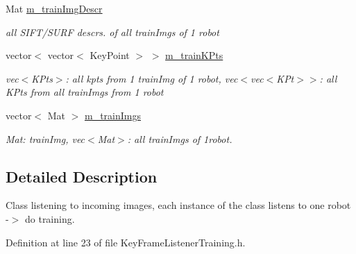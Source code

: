\begin{DoxyCompactItemize}
\-Mat \hyperlink{classKeyFrameListenerTraining_a2db812cb925b74093ef76bc16306d9d7}{m\-\_\-train\-Img\-Descr}
\begin{DoxyCompactList}\small\item\em all \-S\-I\-F\-T/\-S\-U\-R\-F descrs. of all train\-Imgs of 1 robot \end{DoxyCompactList}\item 
vector$<$ vector$<$ \-Key\-Point $>$ $>$ \hyperlink{classKeyFrameListenerTraining_a315dd8f41de6cf586c90f600650a908d}{m\-\_\-train\-K\-Pts}
\begin{DoxyCompactList}\small\item\em vec$<$\-K\-Pts$>$\-: all kpts from 1 train\-Img of 1 robot, vec$<$vec$<$\-K\-Pt$>$$>$\-: all \-K\-Pts from all train\-Imgs from 1 robot \end{DoxyCompactList}\item 
vector$<$ \-Mat $>$ \hyperlink{classKeyFrameListenerTraining_a48bd94c8aaabd896a16fd7bb1557e0e7}{m\-\_\-train\-Imgs}
\begin{DoxyCompactList}\small\item\em \-Mat\-: train\-Img, vec$<$\-Mat$>$\-: all train\-Imgs of 1robot. \end{DoxyCompactList}\end{DoxyCompactItemize}


\subsection{\-Detailed \-Description}
\-Class listening to incoming images, each instance of the class listens to one robot -\/$>$ do training. 

\-Definition at line 23 of file \-Key\-Frame\-Listener\-Training.\-h.



